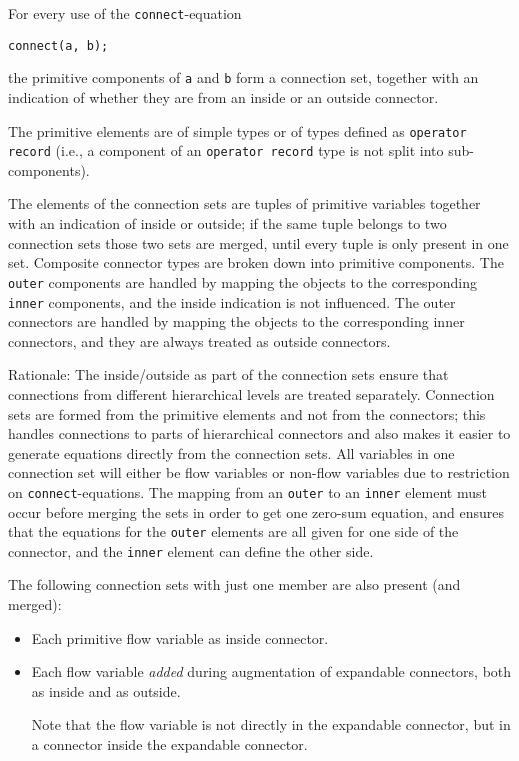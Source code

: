 For every use of the \lstinline!connect!-equation
\begin{lstlisting}[language=modelica]
connect(a, b);
\end{lstlisting}
the primitive components of \lstinline!a! and \lstinline!b! form a connection set, together with an indication of whether they are from an inside or an outside connector.
\begin{definition}\label{primitive-elements}
The primitive elements are of simple types or of types defined as \lstinline!operator record! (i.e., a component of an \lstinline!operator record! type is not split into sub-components).
\end{definition}
The elements of the connection sets are tuples of primitive variables together with an indication of inside or outside; if the same tuple belongs to two connection sets those two sets are merged, until every tuple is only present in one set.
Composite connector types are broken down into primitive components.
The \lstinline!outer! components are handled by mapping the objects to the corresponding \lstinline!inner! components, and the inside indication is not influenced.
The outer connectors are handled by mapping the objects to the corresponding inner connectors, and they are always treated as outside connectors.

\begin{nonnormative}
Rationale: The inside/outside as part of the connection sets ensure that connections from different hierarchical levels are treated separately.
Connection sets are formed from the primitive elements and not from the connectors; this handles connections to parts of hierarchical connectors and also makes it easier to generate equations directly from the connection sets.
All variables in one connection set will either be flow variables or non-flow variables due to restriction on \lstinline!connect!-equations.
The mapping from an \lstinline!outer! to an \lstinline!inner! element must occur before merging the sets in order to get one zero-sum equation, and ensures that the equations for the \lstinline!outer! elements are all given for one side of the connector, and the \lstinline!inner! element can define the other side.
\end{nonnormative}

The following connection sets with just one member are also present (and merged):
\begin{itemize}
\item
  Each primitive flow variable as inside connector.
\item
  Each flow variable \emph{added} during augmentation of expandable connectors, both as inside and as outside.
  \begin{nonnormative}
  Note that the flow variable is not directly in the expandable connector, but in a connector inside the expandable connector.
  \end{nonnormative}
\end{itemize}

